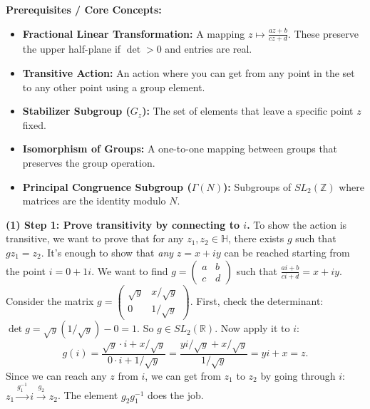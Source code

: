 \begin{solution}
\textbf{Prerequisites / Core Concepts:}
\begin{itemize}
    \item \textbf{Fractional Linear Transformation:} A mapping $z \mapsto \frac{az+b}{cz+d}$. These preserve the upper half-plane if $\det > 0$ and entries are real.
    \item \textbf{Transitive Action:} An action where you can get from any point in the set to any other point using a group element.
    \item \textbf{Stabilizer Subgroup ($G_z$):} The set of elements that leave a specific point $z$ fixed.
    \item \textbf{Isomorphism of Groups:} A one-to-one mapping between groups that preserves the group operation.
    \item \textbf{Principal Congruence Subgroup ($\Gamma(N)$):} Subgroups of $SL_2(\mathbb{Z})$ where matrices are the identity modulo $N$.
\end{itemize}

\textbf{(1) Step 1: Prove transitivity by connecting to $i$.}
To show the action is transitive, we want to prove that for any $z_1, z_2 \in \mathbb{H}$, there exists $g$ such that $gz_1 = z_2$.
It's enough to show that \textit{any} $z = x+iy$ can be reached starting from the point $i = 0 + 1i$.
We want to find $g = \begin{pmatrix} a & b \\ c & d \end{pmatrix}$ such that $\frac{ai+b}{ci+d} = x+iy$.
Consider the matrix $g = \begin{pmatrix} \sqrt{y} & x/\sqrt{y} \\ 0 & 1/\sqrt{y} \end{pmatrix}$.
First, check the determinant: $\det g = \sqrt{y}(1/\sqrt{y}) - 0 = 1$. So $g \in SL_2(\mathbb{R})$.
Now apply it to $i$:
\[ g(i) = \frac{\sqrt{y} \cdot i + x/\sqrt{y}}{0 \cdot i + 1/\sqrt{y}} = \frac{yi/\sqrt{y} + x/\sqrt{y}}{1/\sqrt{y}} = yi + x = z. \]
Since we can reach any $z$ from $i$, we can get from $z_1$ to $z_2$ by going through $i$: $z_1 \xrightarrow{g_1^{-1}} i \xrightarrow{g_2} z_2$. The element $g_2 g_1^{-1}$ does the job.


\end{solution}
